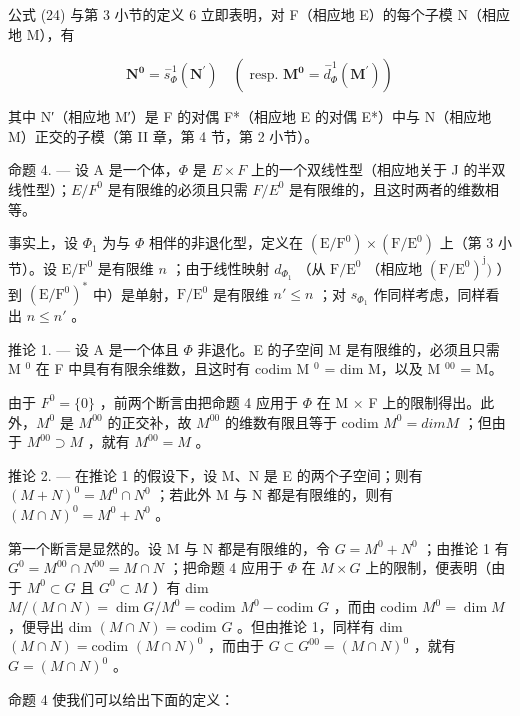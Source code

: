 公式 (24) 与第 3 小节的定义 6 立即表明，对 F（相应地 E）的每个子模 N（相应地 M），有

\[
\mathbf {N ^ {0}} = \stackrel {- 1} {s _ {\Phi}} (\mathbf {N ^ {\prime}}) \quad (\text { resp. } \mathbf {M ^ {0}} = \stackrel {- 1} {d _ {\Phi}} (\mathbf {M ^ {\prime}}))\tag{25}
\]

其中 N′（相应地 M′）是 F 的对偶 F*（相应地 E 的对偶 E*）中与 N（相应地 M）正交的子模（第 II 章，第 4 节，第 2 小节）。

命题 4. --- 设 A 是一个体，\(\Phi\) 是 \(E \times F\) 上的一个双线性型（相应地关于 J 的半双线性型）；\(E/F^{0}\) 是有限维的必须且只需 \(F/E^{0}\) 是有限维的，且这时两者的维数相等。

事实上，设 \(\Phi_{1}\) 为与 \(\Phi\) 相伴的非退化型，定义在 \((\mathrm{E} / \mathrm{F}^{0}) \times (\mathrm{F} / \mathrm{E}^{0})\) 上（第 3 小节）。设 \(\mathrm{E} / \mathrm{F}^{0}\) 是有限维 \(n\) ；由于线性映射 \(d_{\Phi_1}\) （从 \(\mathrm{F} / \mathrm{E}^{0}\) （相应地 \((\mathrm{F} / \mathrm{E}^{0})^{\mathrm{j}})\) ）到 \((\mathrm{E} / \mathrm{F}^{0})^{*}\) 中）是单射，\(\mathrm{F} / \mathrm{E}^{0}\) 是有限维 \(n' \leqslant n\) ；对 \(s_{\Phi_1}\) 作同样考虑，同样看出 \(n \leqslant n'\) 。

推论 1. --- 设 A 是一个体且 \(\Phi\) 非退化。E 的子空间 M 是有限维的，必须且只需 M \(^{0}\) 在 F 中具有有限余维数，且这时有 codim M \(^{0}\) = dim M，以及 M \(^{00}\) = M。

由于 \(F^{0}=\{0\}\) ，前两个断言由把命题 4 应用于 \(\Phi\) 在 M × F 上的限制得出。此外，\(M^{0}\) 是 \(M^{00}\) 的正交补，故 \(M^{00}\) 的维数有限且等于 codim \(M^{0}=dim M\) ；但由于 \(M^{00}\supset M\) ，就有 \(M^{00}=M\) 。

推论 2. --- 在推论 1 的假设下，设 M、N 是 E 的两个子空间；则有 \((M + N)^{0} = M^{0} \cap N^{0}\) ；若此外 M 与 N 都是有限维的，则有 \((M \cap N)^{0} = M^{0} + N^{0}\) 。

第一个断言是显然的。设 M 与 N 都是有限维的，令 \(G = M^{0} + N^{0}\) ；由推论 1 有 \(G^{0} = M^{00} \cap N^{00} = M \cap N\) ；把命题 4 应用于 \(\Phi\) 在 \(M \times G\) 上的限制，便表明（由于 \(M^{0} \subset G\) 且 \(G^{0} \subset M\) ）有 dim \(M/(M \cap N) = \dim G/M^{0} = \text{codim } M^{0} - \text{codim } G\) ，而由 codim \(M^{0} = \dim M\) ，便导出 dim \((M \cap N) = \text{codim } G\) 。但由推论 1，同样有 dim \((M \cap N) = \text{codim } (M \cap N)^{0}\) ，而由于 \(G \subset G^{00} = (M \cap N)^{0}\) ，就有 \(G = (M \cap N)^{0}\) 。

命题 4 使我们可以给出下面的定义：

